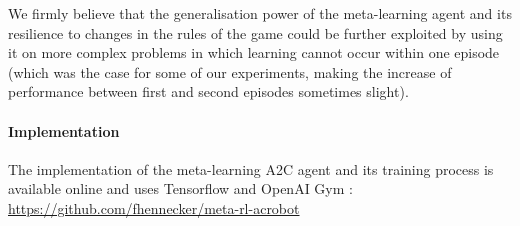\documentclass[letterpaper]{article}
\begin{document}
We firmly believe that the generalisation power of the meta-learning agent
and its resilience to changes in the rules of the game could be further
exploited by using it on more complex problems in which learning cannot occur
within one episode (which was the case for some of our experiments, making
the increase of performance between first and second episodes sometimes slight).

\paragraph{Implementation} The implementation of the meta-learning A2C agent
and its training process is available online and uses 
Tensorflow \citep{tensorflow} and OpenAI Gym \citep{gym}:\\
\url{https://github.com/fhennecker/meta-rl-acrobot}
\footnotesize


\end{document}

